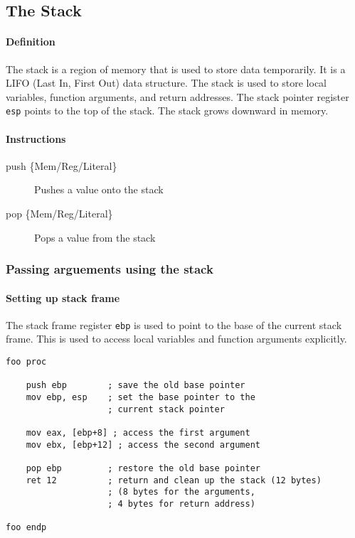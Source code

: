 \subsection{The Stack}
\paragraph*{Definition}
The stack is a region of memory that is used to store data temporarily. It is a LIFO (Last In, First Out) data structure. The stack is used to 
store local variables, function arguments, and return addresses. The stack pointer register \verb|esp| points to the top of the stack. The stack 
grows downward in memory.

\paragraph*{Instructions}
\begin{description}
    \item[push \{Mem/Reg/Literal\}] Pushes a value onto the stack
    \item[pop \{Mem/Reg/Literal\}] Pops a value from the stack
\end{description}

\hrulefill

\subsubsection*{Passing arguements using the stack}
\paragraph*{Setting up stack frame}
The stack frame register \verb|ebp| is used to point to the base of the current stack frame. This is used to access local variables and function arguments
explicitly.
\begin{lstlisting}
foo proc

    push ebp        ; save the old base pointer
    mov ebp, esp    ; set the base pointer to the 
                    ; current stack pointer

    mov eax, [ebp+8] ; access the first argument
    mov ebx, [ebp+12] ; access the second argument

    pop ebp         ; restore the old base pointer
    ret 12          ; return and clean up the stack (12 bytes)
                    ; (8 bytes for the arguments, 
                    ; 4 bytes for return address)

foo endp
\end{lstlisting}

